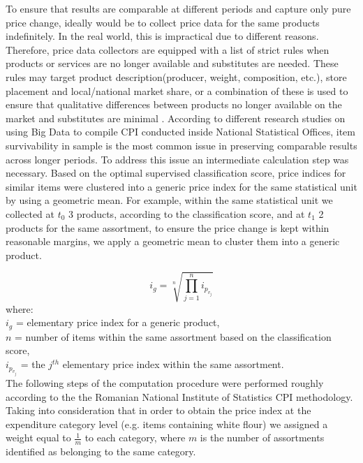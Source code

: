 \documentclass[]{article}
\begin{document}
To ensure that results are comparable at different periods and capture only pure price change, ideally would be to collect price data for the same products indefinitely\cite{cpi2}. In the real world, this is impractical due to different reasons. Therefore, price data collectors are equipped with a list of strict rules when products or services are no longer available and substitutes are needed. These rules may target product description(producer, weight, composition, etc.), store placement and local/national market share, or a combination of these is used to ensure that qualitative differences between products no longer available on the market and substitutes are minimal \cite{cpi}. According to different research studies on using Big Data to compile CPI conducted inside National Statistical Offices, item survivability in sample is the most common issue in preserving comparable results across longer periods\cite{ons2017, willenborg2017, tranzitivity, kints}. To address this issue an intermediate calculation step was necessary. Based on the optimal supervised classification score, price indices for similar items were clustered into a generic price index for the same statistical unit by using a geometric mean. For example, within the same statistical unit we collected at $t_{0}$ 3 products, according to the classification score, and at $t_{1}$ 2 products for the same assortment, to ensure the price change is kept within reasonable margins, we apply a geometric mean to cluster them into a generic product.   

\begin{equation}\label{eq:3}
i_{g} = \sqrt[n]{\prod_{j=1}^{n} i_{p_{v_{j}}}}
\end{equation}
where:\\
$i_{g}$ = elementary price index for a generic product, \\
$n$ = number of items within the same assortment based on the classification score, \\
$i_{p_{v_{j}}}$ = the $j^{th}$ elementary price index within the same assortment.\\


The following steps of the computation procedure were performed roughly according to the the Romanian National Institute of Statistics CPI methodology\cite{cpi}.
Taking into consideration that in order to obtain the price index at the expenditure category level (e.g. items containing white flour) we assigned a weight equal to $\frac{1}{m}$ to each category,
where $m$ is the number of assortments identified as belonging to the same category. 
\end{document}
